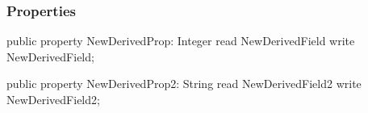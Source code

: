 \documentclass{report}
\newif\ifpdf
\begin{document}
\subsubsection*{\large{\textbf{Properties}}\normalsize\hspace{1ex}\hfill}
\begin{list}{}{
\setlength{\itemindent}{0cm}
\setlength{\listparindent}{0cm}
\setlength{\leftmargin}{\evensidemargin}
\addtolength{\leftmargin}{\tmplength}
\settowidth{\labelsep}{X}
\addtolength{\leftmargin}{\labelsep}
\setlength{\labelwidth}{\tmplength}
}
\label{ok_inherited_members.TNewDerived-NewDerivedProp}
\item[\textbf{NewDerivedProp}\hfill]
\ifpdf
\begin{flushleft}
\fi
\begin{ttfamily}
public property NewDerivedProp: Integer read NewDerivedField write NewDerivedField;\end{ttfamily}

\ifpdf
\end{flushleft}
\fi


\par  \label{ok_inherited_members.TNewDerived-NewDerivedProp2}
\item[\textbf{NewDerivedProp2}\hfill]
\ifpdf
\begin{flushleft}
\fi
\begin{ttfamily}
public property NewDerivedProp2: String read NewDerivedField2 write NewDerivedField2;\end{ttfamily}

\ifpdf
\end{flushleft}
\fi


\par  \end{list}
\end{document}
